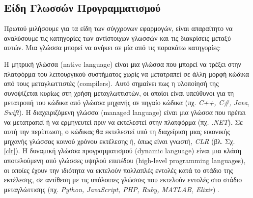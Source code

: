 \subsection{Είδη Γλωσσών Προγραμματισμού}
Πρωτού μιλήσουμε για τα είδη των σύγχρονων εφαρμογών, είναι απαραίτητο να αναλύσουμε τις κατηγορίες των αντίστοιχων γλωσσών και τις διακρίσεις μεταξύ αυτών. Μια γλώσσα μπορεί να ανήκει σε μία από τις παρακάτω κατηγορίες:
\begin{description}[font=$\bullet$~\normalfont\color{black}]
\item [Μετταγλωτισμένες ή Μητρικές γλώσσες (\selectlanguage{english}Compiled or Native Languages)]
\item [Διαχειριζόμενες Γλώσσες (\selectlanguage{english}Managed Languages)]
\item [Δυναμικές Γλώσσες (\selectlanguage{english}Dynamic Languages)]
\end{description}Η μητρική γλώσσα (native language) είναι μια γλώσσα που μπορεί να τρέξει στην πλατφόρμα του λειτουργικού συστήματος χωρίς να μετατραπεί σε άλλη μορφή κώδικα από τους μεταγλωττιστές (compilers). Αυτό σημαίνει πως η υλοποίησή της συνοψίζεται κυρίως στη χρήση μεταγλωττιστών, οι οποίοι είναι υπεύθυνοι για τη μετατροπή του κώδικα από γλώσσα μηχανής σε πηγαίο κώδικα (πχ. \textit{C++, C\#, Java, Swift}). Η διαχειριζόμενη γλώσσα (managed language) είναι μια γλώσσα που πρέπει να μετατραπεί ή να ερμηνευτεί πριν να εκτελεστεί στην πλατφόρμα (πχ. \textit{.NET}). Σε αυτή την περίπτωση, ο κώδικας θα εκτελεστεί υπό τη διαχείριση μιας εικονικής μηχανής γλώσσας κοινού χρόνου εκτέλεσης ή, όπως είναι γνωστή, \textit{CLR} \cite{[STR+09],[DEV+03]} (βλ. Σχ. \ref{clr}). Η δυναμική γλώσσα προγραμματισμού (dynamic language) είναι μια κλάση αποτελούμενη από γλώσσες υψηλού επιπέδου (high-level programming languages), οι οποίες έχουν την ιδιότητα να εκτελούν πολλαπλές εντολές κατά το στάδιο της εκτέλεσης, σε αντίθεση με τις υπόλοιπες γλώσσες που εκτελούν εντολές στο στάδιο μεταγλώττισης  (πχ. \textit{Python, JavaScript, PHP, Ruby, MATLAB, Elixir}) \cite{[MIC05], [ADV09]}.


